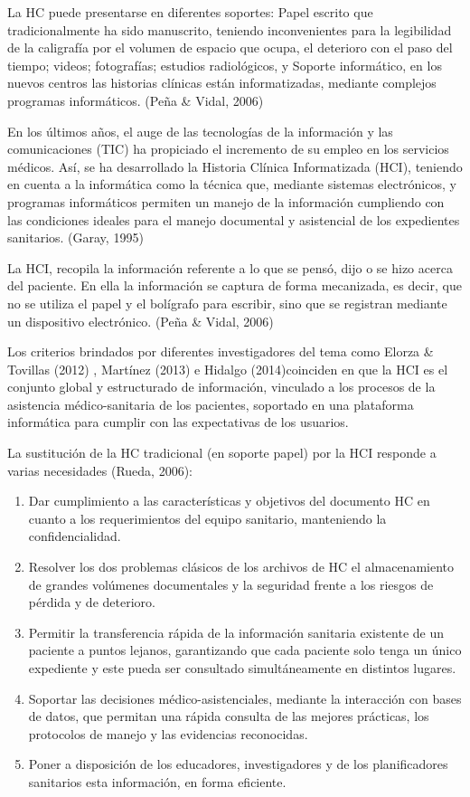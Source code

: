 La HC puede presentarse en diferentes soportes: Papel escrito que tradicionalmente ha sido manuscrito, teniendo inconvenientes para la legibilidad de la caligrafía por el volumen de espacio que ocupa, el deterioro con el paso del tiempo; videos; fotografías; estudios radiológicos, y Soporte informático, en los nuevos centros las historias clínicas están informatizadas, mediante complejos programas informáticos. (Peña \& Vidal, 2006) 

En los últimos años, el auge de las tecnologías de la información y las comunicaciones (TIC) ha propiciado el incremento de su empleo en los servicios médicos. Así, se ha desarrollado la Historia Clínica Informatizada (HCI), teniendo en cuenta a la informática como la técnica que, mediante sistemas electrónicos, y programas informáticos permiten un manejo de la información cumpliendo con las condiciones ideales para el manejo documental y asistencial de los expedientes sanitarios. (Garay, 1995) 

La HCI, recopila la información referente a lo que se pensó, dijo o se hizo acerca del paciente. En ella la información se captura de forma mecanizada, es decir, que no se utiliza el papel y el bolígrafo para escribir, sino que se registran mediante un dispositivo electrónico.  (Peña \& Vidal, 2006) 

Los criterios brindados por diferentes investigadores del tema como  Elorza \& Tovillas (2012) , Martínez (2013)  e Hidalgo (2014)coinciden en que la HCI es el conjunto global y estructurado de información, vinculado a los procesos de la asistencia médico-sanitaria de los pacientes, soportado en una plataforma informática para cumplir con las expectativas de los usuarios. 

La sustitución de la HC tradicional (en soporte papel) por la HCI responde a varias necesidades  (Rueda, 2006):  

\begin{enumerate}
	\item Dar cumplimiento a las características y objetivos del documento HC en cuanto a los requerimientos del equipo sanitario, manteniendo la confidencialidad.  
	
	\item Resolver los dos problemas clásicos de los archivos de HC el almacenamiento de grandes volúmenes documentales y la seguridad frente a los riesgos de pérdida y de deterioro.  
	
	\item Permitir la transferencia rápida de la información sanitaria existente de un paciente a puntos lejanos, garantizando que cada paciente solo tenga un único expediente y este pueda ser consultado simultáneamente en distintos lugares.  
	
	\item Soportar las decisiones médico-asistenciales, mediante la interacción con bases de datos, que permitan una rápida consulta de las mejores prácticas, los protocolos de manejo y las evidencias reconocidas.  
	
	\item Poner a disposición de los educadores, investigadores y de los planificadores sanitarios esta información, en forma eficiente. 
\end{enumerate}

